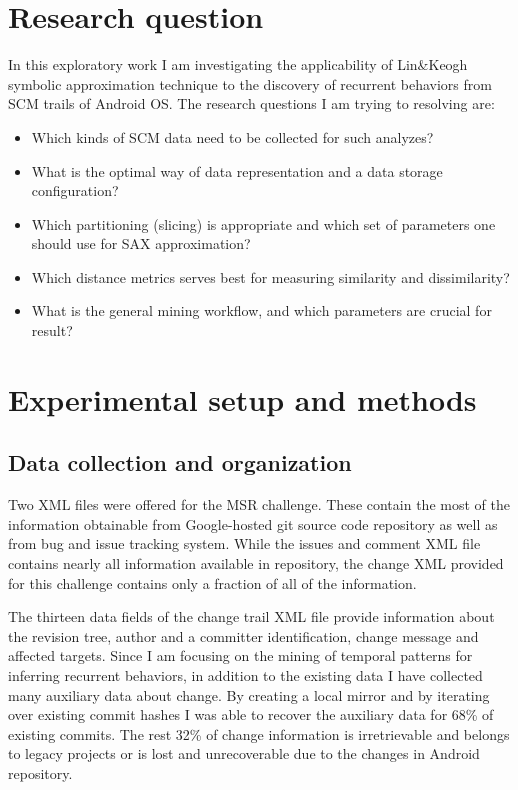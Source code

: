 \documentclass[10pt, conference, compsocconf]{IEEEtran}
\begin{document}
\section{Research question}
In this exploratory work I am investigating the applicability of Lin\&Keogh \cite{citeulike:2821475} 
symbolic approximation technique to the discovery of recurrent behaviors from SCM trails 
of Android OS.
The research questions I am trying to resolving are: 
\begin{itemize}
 \item Which kinds of SCM data need to be collected for such analyzes?
 \item What is the optimal way of data representation and a data storage configuration?
 \item Which partitioning (slicing) is appropriate and which set of parameters one should use for SAX approximation?
 \item Which distance metrics serves best for measuring similarity and dissimilarity?
 \item What is the general mining workflow, and which parameters are crucial for result?
\end{itemize}

\section{Experimental setup and methods}
\subsection{Data collection and organization}
Two XML files were offered for the MSR challenge. These contain the most of the information obtainable 
from Google-hosted git source code repository as well as from bug and issue tracking system.
While the issues and comment XML file contains nearly all information available in repository, 
the change XML provided for this challenge contains only a fraction of all of the information.

The thirteen data fields of the change trail XML file provide information about the revision 
tree, author and a committer identification, change message and affected targets. 
Since I am focusing on the mining of temporal patterns for inferring recurrent behaviors, 
in addition to the existing data I have collected many auxiliary data about change. By creating
a local mirror and by iterating over existing commit hashes I was able to recover the auxiliary 
data for 68\% of existing commits. The rest 32\% of change information is irretrievable and 
belongs to legacy projects or is lost and unrecoverable due to the changes in Android repository. 
\end{document}
